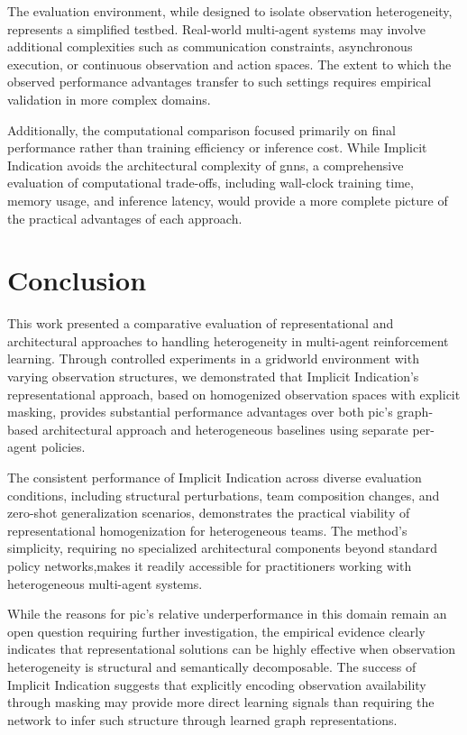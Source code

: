 The evaluation environment, while designed to isolate observation 
heterogeneity, represents a simplified testbed. Real-world multi-agent systems 
may involve additional complexities such as communication constraints, 
asynchronous execution, or continuous observation and action spaces. 
The extent to which the observed performance advantages transfer to 
such settings requires empirical validation in more complex domains.

Additionally, the computational comparison focused primarily on final 
performance rather than training efficiency or inference cost. 
While Implicit Indication avoids the architectural complexity of 
\glspl{gnn}, a comprehensive evaluation of computational trade-offs, 
including wall-clock training time, memory usage, and inference latency, 
would provide a more complete picture of the practical advantages of 
each approach.

\section{Conclusion}

This work presented a comparative evaluation of representational and architectural 
approaches to handling heterogeneity in multi-agent reinforcement learning. 
Through controlled experiments in a gridworld environment with varying observation 
structures, we demonstrated that Implicit Indication's representational approach, 
based on homogenized observation spaces with explicit masking, provides substantial 
performance advantages over both \gls{pic}'s graph-based architectural approach 
and heterogeneous baselines using separate per-agent policies.

The consistent performance of Implicit Indication across diverse evaluation 
conditions, including structural perturbations, team composition changes, 
and zero-shot generalization scenarios, demonstrates the practical 
viability of representational homogenization for heterogeneous teams. 
The method's simplicity, requiring no specialized architectural components 
beyond standard policy networks,makes it readily accessible for practitioners 
working with heterogeneous multi-agent systems.

While the reasons for \gls{pic}'s relative underperformance in this 
domain remain an open question requiring further investigation, 
the empirical evidence clearly indicates that representational 
solutions can be highly effective when observation heterogeneity 
is structural and semantically decomposable. 
The success of Implicit Indication suggests that explicitly 
encoding observation availability through masking may provide 
more direct learning signals than requiring the network to 
infer such structure through learned graph representations.

